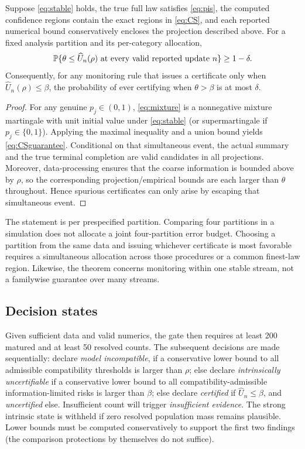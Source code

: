 \begin{theorem}\label{thm:anytime}
Suppose \eqref{eq:stable} holds, the true full law satisfies \eqref{eq:pis}, the computed confidence regions contain the exact regions in \eqref{eq:CS}, and each reported numerical bound conservatively encloses the projection described above. For a fixed analysis partition and its per-category allocation,
\begin{equation}\label{eq:anytime}
 \mathbb P\{\theta\le\widehat U_n(\rho)\text{ at every valid reported update }n\}\ge1-\delta.
\end{equation}
Consequently, for any monitoring rule that issues a certificate only when $\widehat U_n(\rho)\le\beta$, the probability of ever certifying when $\theta>\beta$ is at most $\delta$.
\end{theorem}
\begin{proof}
For any genuine $p_j\in(0,1)$, \eqref{eq:mixture} is a nonnegative mixture martingale with unit initial value under \eqref{eq:stable} (or supermartingale if $p_j\in\{0,1\}$). Applying the maximal inequality and a union bound yields \eqref{eq:CSguarantee}. Conditional on that simultaneous event, the actual summary and the true terminal completion are valid candidates in all projections. Moreover, data-processing ensures that the coarse information is bounded above by $\rho$, so the corresponding projection/empirical bounds are each larger than $\theta$ throughout. Hence spurious certificates can only arise by escaping that simultaneous event.
\end{proof}

The statement is per prespecified partition. Comparing four partitions in a simulation does not allocate a joint four-partition error budget. Choosing a partition from the same data and issuing whichever certificate is most favorable requires a simultaneous allocation across those procedures or a common finest-law region. Likewise, the theorem concerns monitoring within one stable stream, not a familywise guarantee over many streams.

\subsection{Decision states}
Given sufficient data and valid numerics, the gate then requires at least 200 matured and at least 50 resolved counts. The subsequent decisions are made sequentially: declare \emph{model incompatible}, if a conservative lower bound to all admissible compatibility thresholds is larger than $\rho$; else declare \emph{intrinsically uncertifiable} if a conservative lower bound to all compatibility-admissible information-limited risks is larger than $\beta$; else declare \emph{certified} if $\widehat U_n\leq\beta$, and \emph{uncertified} else. Insufficient count will trigger \emph{insufficient evidence}. The strong intrinsic state is withheld if zero resolved population mass remains plausible. Lower bounds must be computed conservatively to support the first two findings (the comparison protections by themselves do not suffice).

